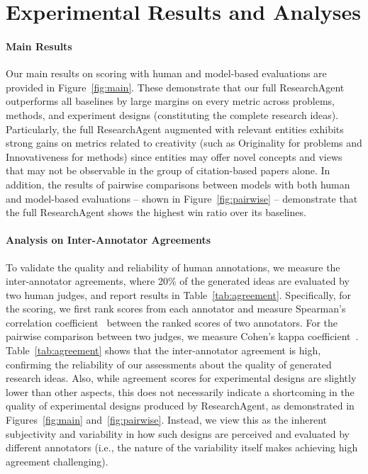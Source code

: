 

\section{Experimental Results and Analyses}
\label{sec:results}

\paragraph{Main Results}
Our main results on scoring with human and model-based evaluations are provided in Figure~\ref{fig:main}. These demonstrate that our full ResearchAgent outperforms all baselines by large margins on every metric across problems, methods, and experiment designs (constituting the complete research ideas). Particularly, the full ResearchAgent augmented with relevant entities exhibits strong gains on metrics related to creativity (such as Originality for problems and Innovativeness for methods) since entities may offer novel concepts and views that may not be observable in the group of citation-based papers alone. In addition, the results of pairwise comparisons between models with both human and model-based evaluations -- shown in Figure~\ref{fig:pairwise} -- demonstrate that the full ResearchAgent shows the highest win ratio over its baselines.  

\paragraph{Analysis on Inter-Annotator Agreements}
To validate the quality and reliability of human annotations, we measure the inter-annotator agreements, where 20\% of the generated ideas are evaluated by two human judges, and report results in Table~\ref{tab:agreement}. Specifically, for the scoring, we first rank scores from each annotator and measure Spearman's correlation coefficient~\cite{spearman} between the ranked scores of two annotators. For the pairwise comparison between two judges, we measure Cohen’s kappa coefficient~\cite{cohen}. Table~\ref{tab:agreement} shows that the inter-annotator agreement is high, confirming the reliability of our assessments about the quality of generated research ideas. Also, while agreement scores for experimental designs are slightly lower than other aspects, this does not necessarily indicate a shortcoming in the quality of experimental designs produced by ResearchAgent, as demonstrated in Figures~\ref{fig:main} and~\ref{fig:pairwise}. Instead, we view this as the inherent subjectivity and variability in how such designs are perceived and evaluated by different annotators (i.e., the nature of the variability itself makes achieving high agreement challenging).

